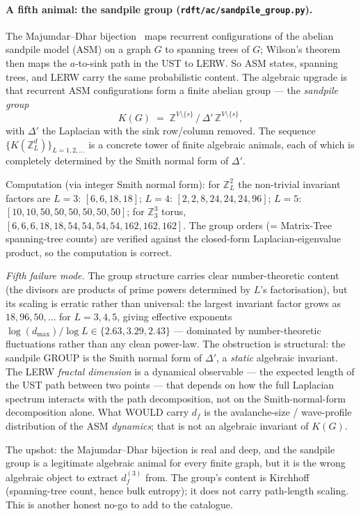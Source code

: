 \documentclass[10pt,a4paper,twocolumn]{article}
\theoremstyle{plain}
\theoremstyle{definition}
\begin{document}
\paragraph{A fifth animal: the sandpile group
(\texttt{rdft/ac/sandpile\_group.py}).}
The Majumdar--Dhar bijection~\citep{MajumdarDhar1992} maps
recurrent configurations of the abelian sandpile model (ASM) on a
graph $G$ to spanning trees of $G$; Wilson's theorem then maps
the $a$-to-sink path in the UST to LERW.  So ASM states, spanning
trees, and LERW carry the same probabilistic content.  The
algebraic upgrade is that recurrent ASM configurations form a
finite abelian group --- the \emph{sandpile group}
\[
  K(G) \;=\; \mathbb{Z}^{V \setminus \{s\}}
   \,/\, \Delta'\, \mathbb{Z}^{V \setminus \{s\}},
\]
with $\Delta'$ the Laplacian with the sink row/column removed.
The sequence $\{K(\mathbb{Z}^d_L)\}_{L=1,2,\dots}$ is a concrete
tower of finite algebraic animals, each of which is completely
determined by the Smith normal form of $\Delta'$.

Computation (via integer Smith normal form): for
$\mathbb{Z}^2_L$ the non-trivial invariant factors are
$L = 3$: $[6, 6, 18, 18]$;
$L = 4$: $[2, 2, 8, 24, 24, 24, 96]$;
$L = 5$: $[10, 10, 50, 50, 50, 50, 50, 50]$;
for $\mathbb{Z}^3_3$ torus,
$[6, 6, 6, 18, 18, 54, 54, 54, 54, 162, 162, 162]$.
The group orders (= Matrix-Tree spanning-tree counts) are verified
against the closed-form Laplacian-eigenvalue product, so the
computation is correct.

\emph{Fifth failure mode.}
The group structure carries clear number-theoretic content (the
divisors are products of prime powers determined by $L$'s
factorisation), but its scaling is erratic rather than universal:
the largest invariant factor grows as $18, 96, 50, \dots$ for
$L = 3, 4, 5$, giving effective exponents
$\log(d_{\max}) / \log L \in \{2.63, 3.29, 2.43\}$ --- dominated
by number-theoretic fluctuations rather than any clean power-law.
The obstruction is structural: the sandpile GROUP is the Smith
normal form of $\Delta'$, a \emph{static} algebraic invariant.
The LERW \emph{fractal dimension} is a dynamical observable --- the
expected length of the UST path between two points --- that
depends on how the full Laplacian spectrum interacts with the
path decomposition, not on the Smith-normal-form decomposition
alone.  What WOULD carry $d_f$ is the avalanche-size / wave-profile
distribution of the ASM \emph{dynamics}; that is not an algebraic
invariant of $K(G)$.

The upshot: the Majumdar--Dhar bijection is real and deep, and
the sandpile group is a legitimate algebraic animal for every
finite graph, but it is the wrong algebraic object to extract
$d_f^{(3)}$ from.  The group's content is Kirchhoff (spanning-tree
count, hence bulk entropy); it does not carry path-length
scaling.  This is another honest no-go to add to the catalogue.
\end{document}
